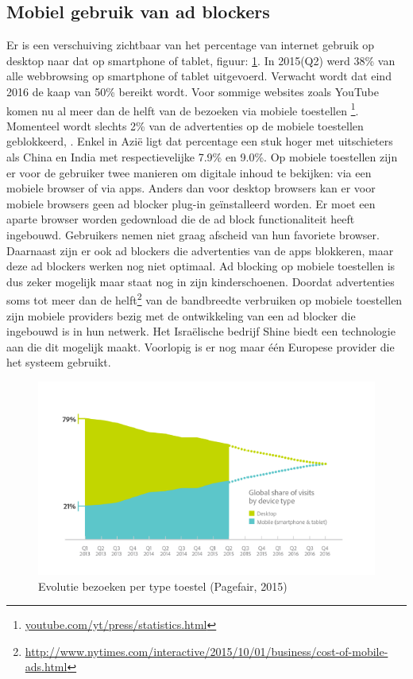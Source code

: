 \documentclass[pdftex,a4paper,12pt,twoside]{report}
\begin{document}
\subsection{Mobiel gebruik van ad blockers}
\label{sec Mobiel gebruik van ad blockers}
Er is een verschuiving zichtbaar van het percentage van internet gebruik op desktop naar dat op smartphone of tablet, figuur: \ref{fig: MobileVsDeskotpInternet}. In 2015(Q2) werd 38\% van alle webbrowsing op smartphone of tablet uitgevoerd. Verwacht wordt dat eind 2016 de kaap van 50\% bereikt wordt. Voor sommige websites zoals YouTube komen nu al meer dan de helft van de bezoeken via mobiele toestellen \footnote{\url{youtube.com/yt/press/statistics.html}}. Momenteel wordt slechts 2\% van de advertenties op de mobiele toestellen geblokkeerd, \cite{PageFair2015}. Enkel in Azië ligt dat percentage een stuk hoger met uitschieters als China en India met respectievelijke 7.9\% en 9.0\%. 
Op mobiele toestellen zijn er voor de gebruiker twee manieren om digitale inhoud te bekijken: via een mobiele browser of via apps. Anders dan voor desktop browsers kan er voor mobiele browsers geen ad blocker plug-in geïnstalleerd worden. Er moet een aparte browser worden gedownload die de ad block functionaliteit heeft ingebouwd. Gebruikers nemen niet graag afscheid van hun favoriete browser. Daarnaast zijn er ook ad blockers die advertenties van de apps blokkeren, maar deze ad blockers werken nog niet optimaal. Ad blocking op mobiele toestellen is dus zeker mogelijk maar staat nog in zijn kinderschoenen.
Doordat advertenties soms tot meer dan de helft\footnote{\url{http://www.nytimes.com/interactive/2015/10/01/business/cost-of-mobile-ads.html}} van de bandbreedte verbruiken op mobiele toestellen zijn mobiele providers bezig met de ontwikkeling van een ad blocker die ingebouwd is in hun netwerk. Het Israëlische bedrijf Shine biedt een technologie aan die dit mogelijk maakt. Voorlopig is er nog maar één Europese provider die het systeem gebruikt.


\begin{figure}[h!]
\centering
\includegraphics[width=12cm]{img/MobileVsDeskotpInternet}
\caption{Evolutie bezoeken per type toestel (Pagefair, 2015)}
\label{fig: MobileVsDeskotpInternet}
\end{figure}
\end{document}
